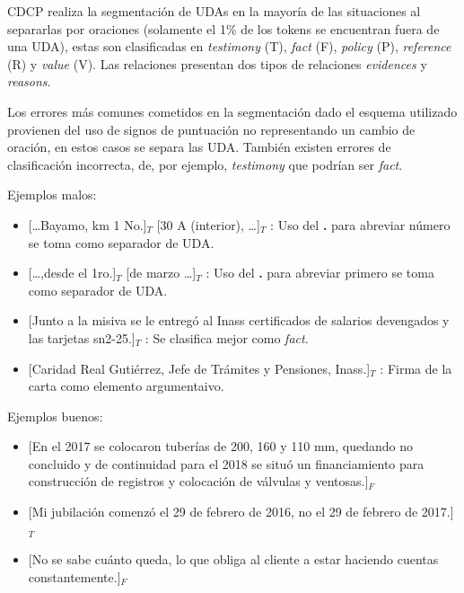 CDCP realiza la segmentación de UDAs en la mayoría de las situaciones al separarlas por oraciones 
(solamente el 1\% de los tokens se encuentran fuera de una UDA),
estas son clasificadas en \emph{testimony} (T), \emph{fact} (F), \emph{policy} (P), \emph{reference} (R)
y \emph{value} (V). Las relaciones presentan dos tipos de relaciones \emph{evidences} y \emph{reasons}.

Los errores más comunes cometidos en la segmentación dado el esquema utilizado provienen del uso 
de signos de puntuación no representando un cambio de oración, en estos casos se separa las UDA. También
existen errores de clasificación incorrecta, de, por ejemplo, \emph{testimony} que podrían ser \emph{fact}.

Ejemplos malos:
\begin{itemize}
	\item \text{} [\dots Bayamo, km 1 No.]$_T$ [30 A (interior), \dots]$_T$ 
	: Uso del \textbf{.} para abreviar número se toma como separador de UDA. %
	\item \text{} [\dots ,desde el 1ro.]$_T$ [de marzo \dots]$_T$ 
	: Uso del \textbf{.} para abreviar primero se toma como separador de UDA. %
	\item \text{} [Junto a la misiva se le entregó al Inass certificados de salarios devengados y las tarjetas sn2-25.]$_T$ 
	: Se clasifica mejor como \emph{fact}. %
	\item \text{} [Caridad Real Gutiérrez, Jefe de Trámites y Pensiones, Inass.]$_T$ 
	: Firma de la carta como elemento argumentaivo. %
\end{itemize}

Ejemplos buenos:
\begin{itemize}
	\item \text{} [En el 2017 se colocaron tuberías de 200, 160 y 110 mm, quedando no concluido y de 
	continuidad para el 2018 se situó un financiamiento para construcción de registros y colocación de 
	válvulas y ventosas.]$_F$ %
	\item \text{} [Mi jubilación comenzó el 29 de febrero de 2016, no el 29 de febrero de 2017.]$_T$ %
	\item \text{} [No se sabe cuánto queda, lo que obliga al cliente a estar haciendo cuentas constantemente.]$_F$ %
\end{itemize}

